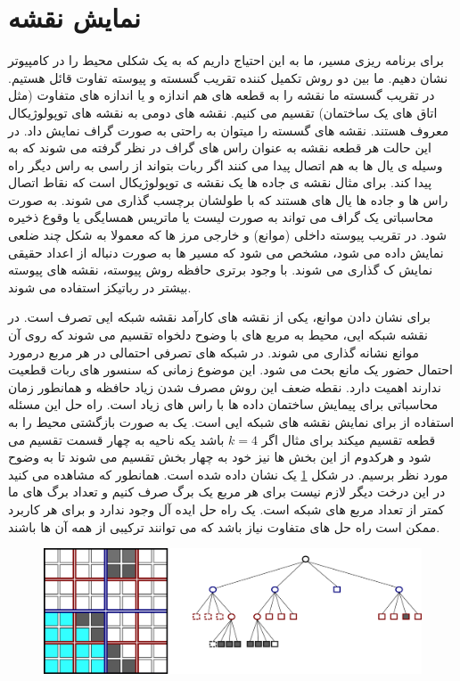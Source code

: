 \section{نمایش نقشه}
برای برنامه ریزی مسیر، ما به این احتیاج داریم که به یک شکلی محیط را در کامپیوتر نشان دهیم.
ما بین دو روش تکمیل کننده تقریب گسسته و پیوسته تفاوت قائل هستیم.
در تقریب گسسته ما نقشه را به قطعه های هم اندازه و یا اندازه های متفاوت
(مثل اتاق های یک ساختمان) تقسیم می کنیم. نقشه های دومی به نقشه های توپولوژیکال معروف هستند.
نقشه های گسسته را میتوان به راحتی به صورت گراف نمایش داد.
 در این حالت هر قطعه نقشه به عنوان راس های گراف در نظر گرفته می شوند
که به وسیله ی یال ها به هم اتصال پیدا می کنند اگر ربات بتواند از راسی به راس دیگر راه پیدا کند.
برای مثال نقشه ی جاده ها یک نقشه ی توپولوژیکال است که نقاط اتصال راس ها و جاده ها یال های هستند که با طولشان برچسب گذاری می شوند.
به صورت محاسباتی یک گراف می تواند  به صورت لیست یا ماتریس همسایگی یا وقوع
ذخیره شود. در تقریب پیوسته داخلی (موانع) و خارجی مرز ها
که معمولا به شکل چند ضلعی نمایش داده می شود، مشخص می شود
که مسیر ها به صورت دنباله از اعداد حقیقی نمایش ک گذاری می شوند. 
با وجود برتری حافظه روش پیوسته، نقشه های پیوسته بیشتر در رباتیکز استفاده می شوند.
 
\par

برای نشان دادن موانع، یکی از نقشه های کارآمد نقشه شبکه ایی تصرف
است. 
در نقشه شبکه ایی، محیط به مربع های با وضوح دلخواه تقسیم می شوند که روی آن موانع نشانه گذاری می شوند. 
در شبکه های تصرفی احتمالی در هر مربع درمورد احتمال حضور یک مانع بحث می شود. این موضوع زمانی 
که سنسور های ربات قطعیت ندارند اهمیت دارد. نقطه ضعف این روش مصرف شدن زیاد حافظه و 
همانطور زمان محاسباتی برای پیمایش ساختمان داده ها با راس های زیاد است. راه حل این مسئله استفاده 
از 
برای نمایش نقشه های شبکه ایی است. یک
 به صورت بازگشتی محیط را به
 قطعه تقسیم میکند 
 برای مثال اگر
$k = 4$
باشد یکه ناحیه به چهار قسمت تقسیم می شود و 
هرکدوم از این بخش ها نیز خود به چهار بخش تقسیم می شوند تا به وضوح مورد نظر برسیم. در 
شکل
\ref{fig:quad-tree}
یک
نشان داده شده است. همانطور که مشاهده می کنید در این درخت دیگر 
لازم نیست برای هر مربع یک برگ صرف کنیم و تعداد برگ های ما کمتر از تعداد مربع های شبکه است.
یک راه حل ایده آل وجود ندارد و برای هر کاربرد ممکن است راه حل های متفاوت نیاز باشد
که می توانند ترکیبی از همه آن ها باشند.
 



\begin{figure}[H]
  \includegraphics[width = \textwidth]{images/quad_tree.png}
  \caption{}
  \label{fig:quad-tree}
\end{figure}
